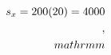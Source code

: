 \documentclass[preview]{standalone}
\begin{document}
\begin{align*}
\special{dvisvgm:raw <g id='unique000'>}s_x = 200(20) = 4000\\,\\mathrm{m}\special{dvisvgm:raw </g>}
\end{align*}
\end{document}
